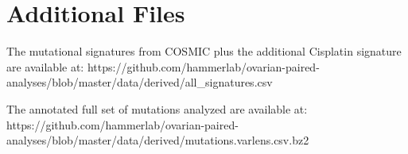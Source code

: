 \section*{Additional Files}

The mutational signatures from COSMIC plus the additional Cisplatin signature are available at: https://github.com/hammerlab/ovarian-paired-analyses/blob/master/data/derived/all_signatures.csv

The annotated full set of mutations analyzed are available at: https://github.com/hammerlab/ovarian-paired-analyses/blob/master/data/derived/mutations.varlens.csv.bz2